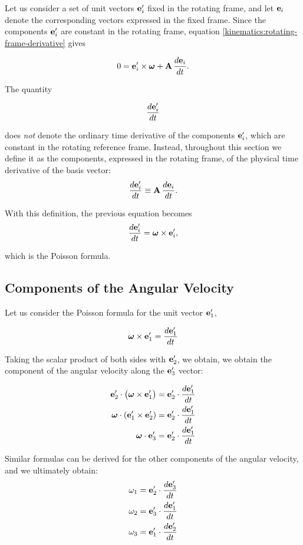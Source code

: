 \documentclass[12pt]{article}
\begin{document}
Let us consider a set of unit vectors $\vb e'_i$ fixed in the rotating frame, and let
$\vb e_i$ denote the corresponding vectors expressed in the fixed frame. Since the
components $\vb e'_i$ are constant in the rotating frame, equation
\eqref{kinematics:rotating-frame-derivative} gives

\[
  0
  =
  \vb e'_i\times\boldsymbol{\omega}
  +
  \vb A\,\frac{d\vb e_i}{dt}.
\]

The quantity

\[
  \frac{d\vb{e}'_i}{dt}
\]

does \emph{not} denote the ordinary time derivative of the components
$\vb{e}'_i$, which are constant in the rotating reference frame. Instead,
throughout this section we define it as the components, expressed in the
rotating frame, of the physical time derivative of the basis vector:
\[
  \frac{d\vb{e}'_i}{dt}
  \equiv
  \vb{A}\,\frac{d\vb{e}_i}{dt}.
\]

With this definition, the previous equation becomes
\[
  \frac{d\vb{e}'_i}{dt}
  =
  \boldsymbol{\omega}\times\vb{e}'_i,
\]

which is the Poisson formula.
\subsection{Components of the Angular Velocity}

Let us consider the Poisson formula for the unit vector $\vb{e}'_1$,

\[
  \boldsymbol{\omega} \times \vb{e}'_1 = \frac{d\vb{e}'_1}{dt}
\]

Taking the scalar product of both sides with $\vb e'_2$, we obtain, we obtain the
component of the angular velocity along the $\vb{e}'_3$ vector:

\begin{align}
  \vb{e}'_2 \cdot \bigl(\boldsymbol{\omega} \times \vb{e}'_1\bigr)
    &= \vb{e}'_2 \cdot \frac{d\vb{e}'_1}{dt} \\
  \boldsymbol{\omega} \cdot (\vb{e}'_1 \times \vb{e}'_2)
    &= \vb{e}'_2 \cdot \frac{d\vb{e}'_1}{dt} \\
  \boldsymbol{\omega} \cdot \vb{e}'_3
    &= \vb{e}'_2 \cdot \frac{d\vb{e}'_1}{dt}
\end{align}

Similar formulas can be derived for the other components of the angular velocity, and we
ultimately obtain:
\begin{align}
  \omega_1 &= \vb{e}'_2 \cdot \frac{d\vb{e}'_3}{dt} \\
  \omega_2 &= \vb{e}'_3 \cdot \frac{d\vb{e}'_1}{dt} \\
  \omega_3 &= \vb{e}'_1 \cdot \frac{d\vb{e}'_2}{dt}
\end{align}
\end{document}
